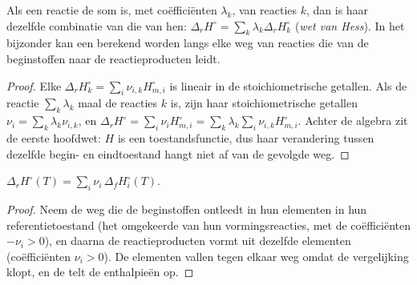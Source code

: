 \begin{theorem}\label{thm:b2:reaction-enthalpy:hess}
Als een reactie de som is, met coëfficiënten $\lambda_k$, van reacties $k$,
dan is haar  dezelfde combinatie van die van hen:
$\Delta_r H^\circ = \sum_k\lambda_k\Delta_r H_k^\circ$
(\emph{wet van Hess}). In het bijzonder kan een 
berekend worden langs elke weg van reacties die van de
beginstoffen naar de reactieproducten leidt.
\end{theorem}

\begin{proof}
Elke $\Delta_r H_k^\circ = \sum_i\nu_{i,k}H_{m,i}^\circ$ is lineair in de
stoichiometrische getallen. Als de reactie $\sum_k\lambda_k$ maal de
reacties $k$ is, zijn haar stoichiometrische getallen $\nu_i = \sum_k\lambda_k
\nu_{i,k}$, en $\Delta_r H^\circ = \sum_i\nu_iH_{m,i}^\circ = \sum_k\lambda_k
\sum_i\nu_{i,k}H_{m,i}^\circ$. Achter de algebra zit de eerste hoofdwet: $H$ is een
toestandsfunctie, dus haar verandering tussen dezelfde begin- en eindtoestand
hangt niet af van de gevolgde weg.
\end{proof}

\begin{proposition}\label{prop:b2:reaction-enthalpy:formation-sum}
$\Delta_r H^\circ(T) = \sum_i\nu_i\,\Delta_f H_i^\circ(T)$.
\end{proposition}

\begin{proof}
Neem de weg die de beginstoffen ontleedt in hun elementen in hun
referentietoestand (het omgekeerde van hun vormingsreacties, met de
coëfficiënten $-\nu_i > 0$), en daarna de reactieproducten vormt uit dezelfde elementen
(coëfficiënten $\nu_i > 0$). De elementen vallen tegen elkaar weg omdat de vergelijking
klopt, en de  telt de enthalpieën op.
\end{proof}


